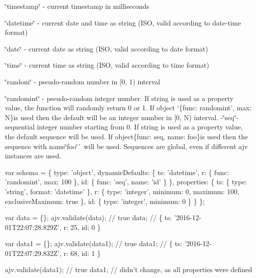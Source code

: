 \begin{DoxyItemize}
\item {\ttfamily \char`\"{}timestamp\char`\"{}} -\/ current timestamp in milliseconds
\item {\ttfamily \char`\"{}datetime\char`\"{}} -\/ current date and time as string (I\+SO, valid according to {\ttfamily date-\/time} format)
\item {\ttfamily \char`\"{}date\char`\"{}} -\/ current date as string (I\+SO, valid according to {\ttfamily date} format)
\item {\ttfamily \char`\"{}time\char`\"{}} -\/ current time as string (I\+SO, valid according to {\ttfamily time} format)
\item {\ttfamily \char`\"{}random\char`\"{}} -\/ pseudo-\/random number in \mbox{[}0, 1) interval
\item {\ttfamily \char`\"{}randomint\char`\"{}} -\/ pseudo-\/random integer number. If string is used as a property value, the function will randomly return 0 or 1. If object `\{func\+: \textquotesingle{}randomint', max\+: N\}{\ttfamily is used then the default will be an integer number in \mbox{[}0, N) interval. -\/}\char`\"{}seq\char`\"{}{\ttfamily -\/ sequential integer number starting from 0. If string is used as a property value, the default sequence will be used. If object}\{func\+: \textquotesingle{}seq\textquotesingle{}, name\+: \textquotesingle{}foo\textquotesingle{}\}{\ttfamily is used then the sequence with name}\char`\"{}foo\char`\"{}\`{} will be used. Sequences are global, even if different ajv instances are used.
\end{DoxyItemize}


\begin{DoxyCode}
var schema = \{
  type: 'object',
  dynamicDefaults: \{
    ts: 'datetime',
    r: \{ func: 'randomint', max: 100 \},
    id: \{ func: 'seq', name: 'id' \}
  \},
  properties: \{
    ts: \{
      type: 'string',
      format: 'datetime'
    \},
    r: \{
      type: 'integer',
      minimum: 0,
      maximum: 100,
      exclusiveMaximum: true
    \},
    id: \{
      type: 'integer',
      minimum: 0
    \}
  \}
\};

var data = \{\};
ajv.validate(data); // true
data; // \{ ts: '2016-12-01T22:07:28.829Z', r: 25, id: 0 \}

var data1 = \{\};
ajv.validate(data1); // true
data1; // \{ ts: '2016-12-01T22:07:29.832Z', r: 68, id: 1 \}

ajv.validate(data1); // true
data1; // didn't change, as all properties were defined
\end{DoxyCode}



